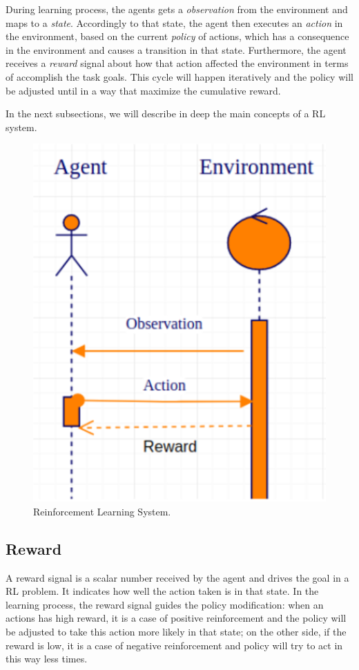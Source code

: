 During learning process, the agents gets a \textit{observation} from the environment and maps to a \textit{state}. Accordingly to that state, the agent then executes an \textit{action} in the environment, based on the current \textit{policy} of actions, which has a consequence in the environment and causes a transition in that state. Furthermore, the agent receives a \textit{reward} signal about how that action affected the environment in terms of accomplish the task goals. This cycle will happen iteratively and the policy will be adjusted until in a way that maximize the cumulative reward.

In the next subsections, we will describe in deep the main concepts of a RL system.

\begin{figure}[!htpb]
	\centering
	\includegraphics[scale=0.5]{Cap4/rlsystem.eps}
	\caption{Reinforcement Learning System.}
	\label{fig:rlsystem}
\end{figure}

\subsection{Reward}\label{sec:reward}
A reward signal is a scalar number received by the agent and drives the goal in a RL problem. It indicates how well the action taken is in that state. In the learning process, the reward signal guides the policy modification: when an actions has high reward, it is a case of positive reinforcement and the policy will be adjusted to take this action more likely in that state; on the other side, if the reward is low, it is a case of negative reinforcement and policy will try to act in this way less times.


